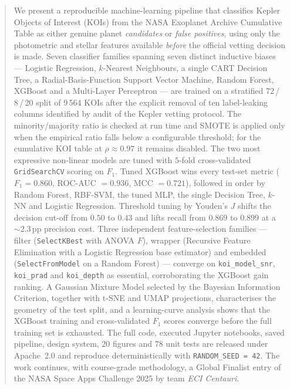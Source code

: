 \documentclass[conference]{IEEEtran}
\begin{document}
\begin{abstract}
We present a reproducible machine-learning pipeline that classifies
Kepler Objects of Interest (KOIs) from the NASA Exoplanet Archive
Cumulative Table as either genuine planet \emph{candidates} or
\emph{false positives}, using only the photometric and stellar
features available \emph{before} the official vetting decision is
made. Seven classifier families spanning seven distinct inductive
biases --- Logistic Regression, $k$-Nearest Neighbours, a single
CART Decision Tree, a Radial-Basis-Function Support Vector Machine,
Random Forest, XGBoost and a Multi-Layer Perceptron --- are trained
on a stratified 72\,/\,8\,/\,20 split of 9\,564 KOIs after the
explicit removal of ten label-leaking columns identified by audit
of the Kepler vetting protocol. The minority/majority ratio is
checked at run time and SMOTE is applied only when the empirical
ratio falls below a configurable threshold; for the cumulative KOI
table at $\rho \approx 0.97$ it remains disabled. The two most
expressive non-linear models are tuned with $5$-fold cross-validated
\texttt{GridSearchCV} scoring on $F_1$. Tuned XGBoost wins every
test-set metric ($F_1 = 0.860$, ROC-AUC $= 0.936$, MCC $= 0.721$),
followed in order by Random Forest, RBF-SVM, the tuned MLP, the
single Decision Tree, $k$-NN and Logistic Regression. Threshold
tuning by Youden's $J$ shifts the decision cut-off from $0.50$ to
$0.43$ and lifts recall from $0.869$ to $0.899$ at a ${\sim}2.3$\,pp
precision cost. Three independent feature-selection families ---
filter (\texttt{SelectKBest} with ANOVA $F$), wrapper (Recursive
Feature Elimination with a Logistic Regression base estimator) and
embedded (\texttt{SelectFromModel} on a Random Forest) ---
converge on \texttt{koi\_model\_snr}, \texttt{koi\_prad} and
\texttt{koi\_depth} as essential, corroborating the XGBoost gain
ranking. A Gaussian Mixture Model selected by the Bayesian
Information Criterion, together with t-SNE and UMAP projections,
characterises the geometry of the test split, and a learning-curve
analysis shows that the XGBoost training and cross-validated
$F_1$ scores converge before the full training set is exhausted.
The full code, executed Jupyter notebooks, saved pipeline, design
system, $20$ figures and $78$ unit tests are released under
Apache~2.0 and reproduce deterministically with
\texttt{RANDOM\_SEED = 42}. The work continues, with course-grade
methodology, a Global Finalist entry of the NASA Space Apps
Challenge 2025 by team \emph{ECI Centauri}.
\end{abstract}
\end{document}

